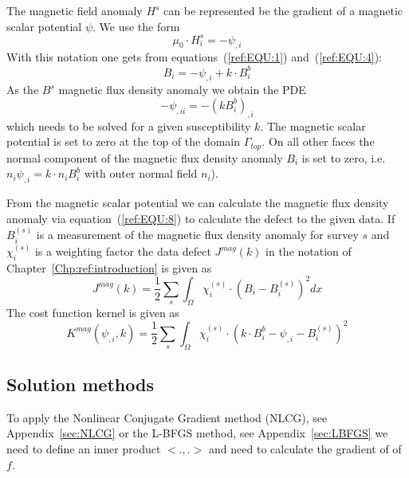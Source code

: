 The magnetic field anomaly $H^s$ can be represented be the gradient of a magnetic scalar potential
$\psi$. We use the form 
\begin{equation}\label{ref:EQU:6}
\mu_0  \cdot H^s_i = - \psi_{,i}
\end{equation}
With this notation one gets from equations~(\ref{ref:EQU:1}) and~(\ref{ref:EQU:4}):
\begin{equation}\label{ref:EQU:7}
B_i = - \psi_{,i}  + k \cdot B^b_i
\end{equation}
As the $B^s$ magnetic flux density anomaly we obtain the PDE  
\begin{equation}\label{ref:EQU:8}
- \psi_{,ii} = - (k B^b_i)_{,i} 
\end{equation} 
which needs to be solved for a given susceptibility $k$. The magnetic scalar potential is set to zero 
at the top of the domain $\Gamma_{top}$. On all other faces the normal component of the magnetic flux density anomaly $B_i$
is set to zero, i.e. $n_i \psi_{,i}  = k \cdot n_i  B^b_i$ with outer normal field $n_i$).

From the magnetic scalar potential we can calculate the magnetic flux density anomaly via equation~(\ref{ref:EQU:8}) to
calculate the defect to the given data. If $B^{(s)}_i$ is a measurement of the magnetic flux density anomaly for 
survey $s$ and $\chi^{(s)}_i$ is a weighting factor the data defect $J^{mag}(k)$ in the notation of Chapter~\ref{Chp:ref:introduction}
is given as
\begin{equation}\label{ref:EQU:9}
J^{mag}(k) = \frac{1}{2}\sum_{s} \int_{\Omega} \chi^{(s)}_i \cdot (B_{i}- B^{(s)}_i)^2 dx
\end{equation} 
The cost function kernel is given as
\begin{equation}\label{ref:EQU:10}
K^{mag}(\psi_{,i},k) = \frac{1}{2}\sum_{s} \int_{\Omega} \chi^{(s)}_i \cdot (k \cdot B^b_i - \psi_{,i} - B^{(s)}_i)^2
\end{equation} 



\subsection{Solution methods}
To apply the Nonlinear Conjugate Gradient method (NLCG), see Appendix~\ref{sec:NLCG} or the L-BFGS method, see Appendix~\ref{sec:LBFGS} we need
to define an inner product $<.,.>$ and need to calculate the gradient of of $f$. 

